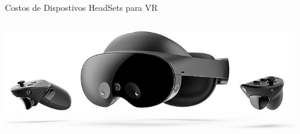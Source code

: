 \begin{frame}{Costos de Dispostivos HeadSets para VR}
\begin{columns}
\begin{column}{0.49\textwidth}
\begin{center}
\includegraphics[width=0.95\textwidth]{Figs/MetaPro.jpg}
\end{center}
\end{column}
\end{columns}
\end{frame}
